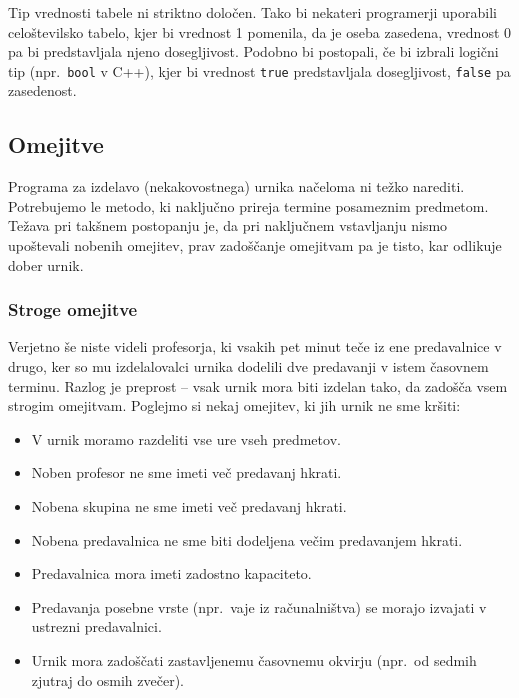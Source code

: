 \documentclass[a4paper, 10pt]{article}
\begin{document}
Tip vrednosti tabele ni striktno določen. Tako bi nekateri programerji uporabili
celoštevilsko tabelo, kjer bi vrednost 1 pomenila, da je oseba zasedena, vrednost 0
pa bi predstavljala njeno dosegljivost. Podobno bi postopali, če bi izbrali logični
tip (npr.\ \verb|bool| v C++), kjer bi vrednost \verb|true| predstavljala
dosegljivost, \verb|false| pa zasedenost.

\subsection{Omejitve}

Programa za izdelavo (nekakovostnega) urnika načeloma ni težko narediti. Potrebujemo
le metodo, ki naključno prireja termine posameznim predmetom. Težava pri takšnem postopanju
je, da pri naključnem vstavljanju nismo upoštevali nobenih omejitev, prav zadoščanje omejitvam
pa je tisto, kar odlikuje dober urnik.

\subsubsection{Stroge omejitve}

Verjetno še niste videli profesorja, ki vsakih pet minut teče iz ene predavalnice v drugo,
ker so mu izdelalovalci urnika dodelili dve predavanji v istem časovnem terminu. Razlog
je preprost \--- vsak urnik mora biti izdelan tako, da zadošča vsem strogim omejitvam.
Poglejmo si nekaj omejitev, ki jih urnik ne sme kršiti:

\begin{itemize}
   \item V urnik moramo razdeliti vse ure vseh predmetov.
   \item Noben profesor ne sme imeti več predavanj hkrati.
   \item Nobena skupina ne sme imeti več predavanj hkrati.
   \item Nobena predavalnica ne sme biti dodeljena večim predavanjem hkrati.
   \item Predavalnica mora imeti zadostno kapaciteto.
   \item Predavanja posebne vrste (npr.\ vaje iz računalništva) se morajo izvajati v ustrezni predavalnici.
   \item Urnik mora zadoščati zastavljenemu časovnemu okvirju (npr.\ od sedmih zjutraj do osmih zvečer).
\end{itemize}
\end{document}
